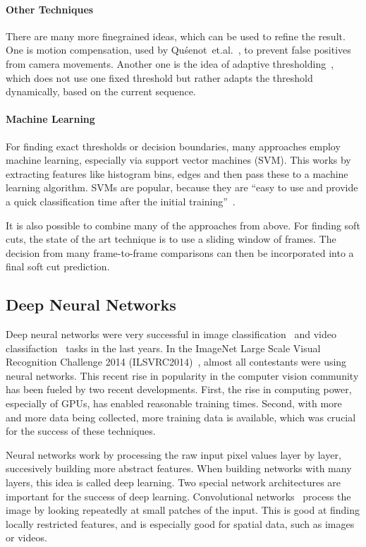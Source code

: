 \paragraph{Other Techniques}
There are many more finegrained ideas, which can be used to refine the result.
One is motion compensation, used by Qu{\'s}enot~et.al.~\cite{qousenot2003clips}, to prevent false positives from camera movements.
Another one is the idea of adaptive thresholding~\cite{volkmer2004rmit}, which does not use one fixed threshold but rather adapts the threshold dynamically, based on the current sequence.

\paragraph{Machine Learning}
For finding exact thresholds or decision boundaries, many approaches employ machine learning, especially via support vector machines (SVM).
This works by extracting features like histogram bins, edges and then pass these to a machine learning algorithm.
SVMs are popular, because they are ``easy to use and provide a quick classification time after the initial training''~\cite{smeaton2010video}.


It is also possible to combine many of the approaches from above.
For finding soft cuts, the state of the art technique is to use a sliding window of frames.
The decision from many frame-to-frame comparisons can then be incorporated into a final soft cut prediction.

\subsection{Deep Neural Networks}
Deep neural networks were very successful in image classification~\cite{krizhevsky2012imagenet} and video classifaction~\cite{karpathy2014large} tasks in the last years.
In the ImageNet Large Scale Visual Recognition Challenge 2014 (ILSVRC2014)~\cite{imagenet}, almost all contestants were using neural networks.
This recent rise in popularity in the computer vision community has been fueled by two recent developments.
First, the rise in computing power, especially of GPUs, has enabled reasonable training times.
Second, with more and more data being collected, more training data is available, which was crucial for the success of these techniques.

Neural networks work by processing the raw input pixel values layer by layer, succesively building more abstract features.
When building networks with many layers, this idea is called deep learning.
Two special network architectures are important for the success of deep learning.
Convolutional networks~\cite{lecun1998gradient} process the image by looking repeatedly at small patches of the input.
This is good at finding locally restricted features, and is especially good for spatial data, such as images or videos.

